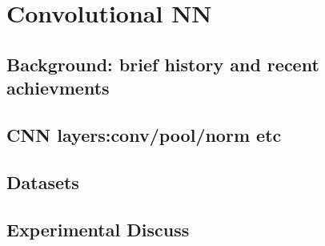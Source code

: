 \chapter{Convolutional NN}

\section{Background: brief history and recent achievments}


\section{CNN layers:conv/pool/norm etc}

\section{Datasets}

\section{Experimental Discuss}
